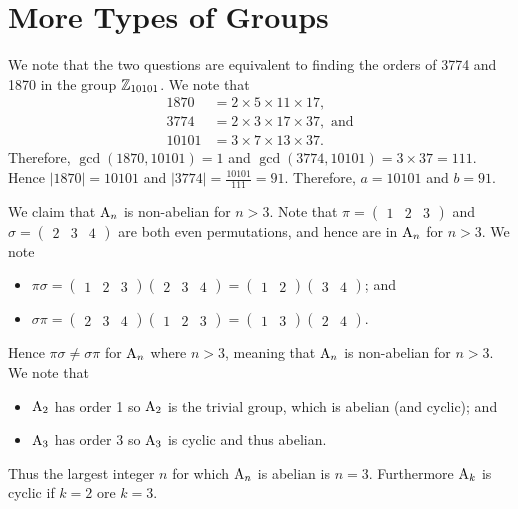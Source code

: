 \section{More Types of Groups}
\begin{questions}
    \item We note that the two questions are equivalent to finding the orders of 3774 and 1870 in the group $\mathbb{Z}_{10101}$. We note that
    \begin{align*}
        1870 &= 2 \times 5 \times 11 \times 17,\\
        3774 &= 2 \times 3 \times 17 \times 37, \text{ and}\\
        10101 &= 3 \times 7 \times 13 \times 37.
    \end{align*}
    Therefore, $\gcd(1870, 10101) = 1$ and $\gcd(3774, 10101) = 3 \times 37 = 111$. Hence $|1870| = 10101$ and $|3774| = \frac{10101}{111} = 91$. Therefore, $a = 10101$ and $b = 91$.

    \item We claim that $\mathrm{A}_{n}$ is non-abelian for $n > 3$. Note that $\pi = \begin{pmatrix}1 & 2 & 3\end{pmatrix}$ and $\sigma = \begin{pmatrix}2 & 3 & 4\end{pmatrix}$ are both even permutations, and hence are in $\mathrm{A}_{n}$ for $n > 3$. We note
    \begin{itemize}
        \item $\pi\sigma = \begin{pmatrix}1 & 2 & 3\end{pmatrix}\begin{pmatrix}2 & 3 & 4\end{pmatrix} = \begin{pmatrix}1 & 2\end{pmatrix}\begin{pmatrix}3 & 4\end{pmatrix}$; and
        \item $\sigma\pi = \begin{pmatrix}2 & 3 & 4\end{pmatrix}\begin{pmatrix}1 & 2 & 3\end{pmatrix} = \begin{pmatrix}1 & 3\end{pmatrix}\begin{pmatrix}2 & 4\end{pmatrix}$.
    \end{itemize}
    Hence $\pi\sigma \neq \sigma\pi$ for $\mathrm{A}_{n}$ where $n > 3$, meaning that $\mathrm{A}_{n}$ is non-abelian for $n > 3$. We note that
    \begin{itemize}
        \item $\mathrm{A}_{2}$ has order 1 so $\mathrm{A}_{2}$ is the trivial group, which is abelian (and cyclic); and
        \item $\mathrm{A}_{3}$ has order 3 so $\mathrm{A}_{3}$ is cyclic and thus abelian.
    \end{itemize}
    Thus the largest integer $n$ for which $\mathrm{A}_{n}$ is abelian is $n = 3$. Furthermore $\mathrm{A}_{k}$ is cyclic if $k = 2$ ore $k = 3$.


\end{questions}
